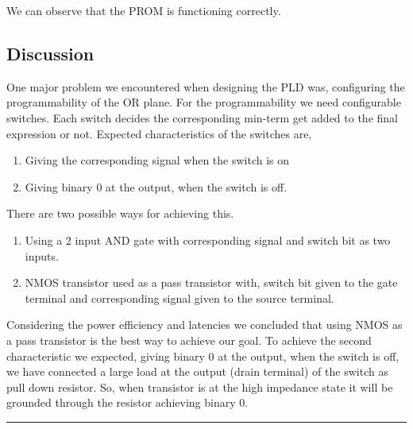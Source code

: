 \documentclass[a4paper,11pt]{article}%
\begin{document}
We can observe that the PROM is functioning correctly.

\subsection{Discussion}


One major problem we encountered when designing the PLD was, configuring the programmability of the OR plane. For the programmability we need configurable switches. Each switch decides the corresponding min-term get added to the final expression or not. Expected characteristics of the switches are,
\begin{enumerate}[\hspace{1cm}1.]
	\item Giving the corresponding signal when the switch is on
	\item Giving binary 0 at the output, when the switch is off.

\end{enumerate}
There are two possible ways for achieving this.
\begin{enumerate}[\hspace{1cm}1.]
	\item Using a 2 input AND gate with corresponding signal and switch bit as two inputs.
	\item NMOS transistor used as a pass transistor with, switch bit given to the gate terminal and corresponding signal given to the source terminal.

\end{enumerate}
Considering the power efficiency and latencies we concluded that using NMOS as a pass transistor is the best way to achieve our goal.
To achieve the second characteristic we expected, giving binary 0 at the output, when the switch is off, we have connected a large load at the output (drain terminal) of the switch as pull
down resistor. So, when transistor is at the high impedance state it will be grounded through the resistor achieving binary 0.\\
\vfill

\hrule
{\scriptsize


}
\end{document}
